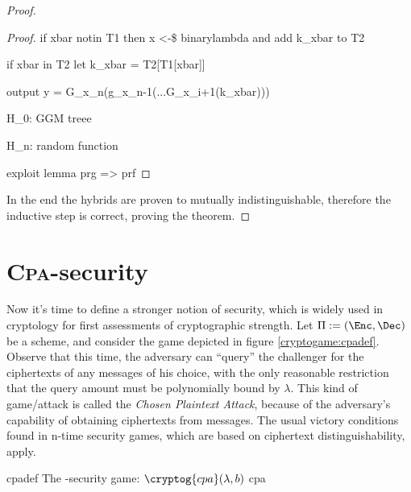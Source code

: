 \begin{proof}
\begin{proof}
{        if xbar notin T1 then x <-\$ binarylambda and add k\_xbar to T2

        if xbar in T2 let k\_xbar = T2[T1[xbar]]

        output y = G\_x\_n(g\_x\_n-1(...G\_x\_i+1(k\_xbar)))

        H\_0: GGM treee
        
        H\_n: random function

        exploit lemma prg => prf
        }
        
    \end{proof}

    In the end the hybrids are proven to mutually indistinguishable, therefore the inductive step is correct, proving the theorem.

\end{proof}

\section{\textsc{Cpa}-security}

Now it's time to define a stronger notion of security, which is widely used in cryptology for first assessments of cryptographic strength. Let $\Pi := (\Enc, \Dec)$ be a \ske{} scheme, and consider the game depicted in figure \ref{cryptogame:cpadef}. Observe that this time, the adversary can ``query'' the challenger for the ciphertexts of any messages of his choice, with the only reasonable restriction that the query amount must be polynomially bound by $\lambda$. This kind of game/attack is called the \emph{Chosen Plaintext Attack}, because of the adversary's capability of obtaining ciphertexts from messages. The usual victory conditions found in n-time security games, which are based on ciphertext distinguishability, apply.

\begin{cryptogame}
    {cpadef}
    {The \cpa-security game: $\cryptog{cpa}(\lambda, b)$}
    {cpa}


    \cseqbeginloop
    \cseqendloop

    \cseqdelay


    \cseqdelay

    \cseqbeginloop
    \cseqendloop

    \cseqdelay


\end{cryptogame}

